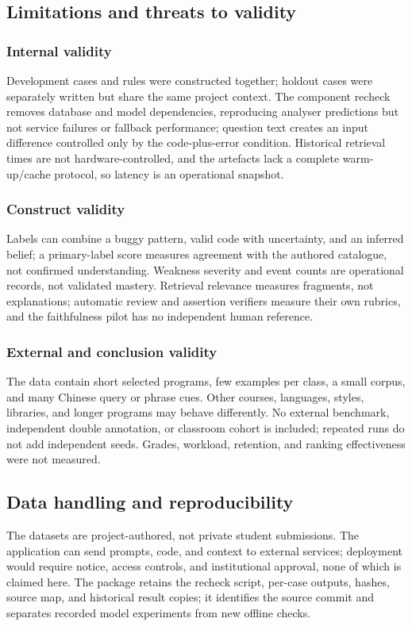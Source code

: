 \subsection{Limitations and threats to validity}
\subsubsection{Internal validity}
Development cases and rules were constructed together; holdout cases were separately written but share the same project context. The component recheck removes database and model dependencies, reproducing analyser predictions but not service failures or fallback performance; question text creates an input difference controlled only by the code-plus-error condition. Historical retrieval times are not hardware-controlled, and the artefacts lack a complete warm-up/cache protocol, so latency is an operational snapshot.

\subsubsection{Construct validity}
Labels can combine a buggy pattern, valid code with uncertainty, and an inferred belief; a primary-label score measures agreement with the authored catalogue, not confirmed understanding. Weakness severity and event counts are operational records, not validated mastery. Retrieval relevance measures fragments, not explanations; automatic review and assertion verifiers measure their own rubrics, and the faithfulness pilot has no independent human reference.

\subsubsection{External and conclusion validity}
The data contain short selected programs, few examples per class, a small corpus, and many Chinese query or phrase cues. Other courses, languages, styles, libraries, and longer programs may behave differently. No external benchmark, independent double annotation, or classroom cohort is included; repeated runs do not add independent seeds. Grades, workload, retention, and ranking effectiveness were not measured.

\subsection{Data handling and reproducibility}
The datasets are project-authored, not private student submissions. The application can send prompts, code, and context to external services; deployment would require notice, access controls, and institutional approval, none of which is claimed here. The package retains the recheck script, per-case outputs, hashes, source map, and historical result copies; it identifies the source commit and separates recorded model experiments from new offline checks.
